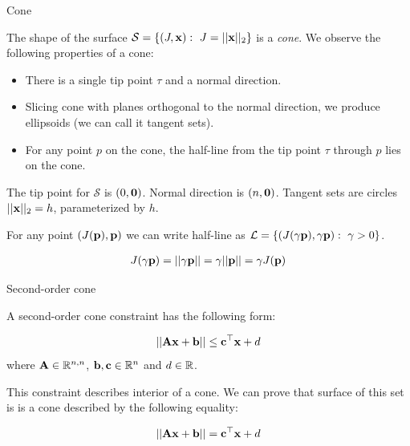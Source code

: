 \documentclass{beamer}
\begin{document}
\begin{frame}{Cone}
	\begin{flushleft}
		
		The shape of the surface $\mathcal S = \{  (J, \mathbf{x}): \ J = || \mathbf{x} ||_2 \}$ is a \emph{cone}. We observe the following properties of a cone:
		
		\begin{itemize}
			\item There is a single tip point $\tau$ and a normal direction.
			
			\item  Slicing cone with planes orthogonal to the normal direction, we produce ellipsoids (we can call it tangent sets).
			
			\item For any point $p$ on the cone, the half-line from the tip point $\tau$ through $p$ lies on the cone.
		\end{itemize}
	
		\bigskip
	
		The tip point for $\mathcal S$ is $(0, \mathbf{0})$. Normal direction is $(n, \mathbf{0})$. Tangent sets are circles $|| \mathbf{x} ||_2 = h$, parameterized by $h$. 
		
		For any point $(J(\mathbf{p}), \mathbf{p})$ we can write half-line as $\mathcal L = \{ ( J(\gamma \mathbf{p}), \gamma \mathbf{p}): \ \gamma > 0 \}$.
		
		\begin{align}
			J(\gamma \mathbf{p}) = ||\gamma \mathbf{p}|| = \gamma ||\mathbf{p}|| = \gamma J(\mathbf{p})
		\end{align}
		
	\end{flushleft}
\end{frame}



\begin{frame}{Second-order cone}
	\begin{flushleft}
		
		A second-order cone constraint has the following form:
		
		\begin{equation}
			||\mathbf{A}\mathbf{x}+\mathbf{b}|| \leq \mathbf{c}^\top \mathbf{x} + d
		\end{equation}
		where $\mathbf{A} \in \mathbb{R}^{n, n}$, $\mathbf{b}, \mathbf{c} \in \mathbb{R}^{n}$ and $d \in \mathbb{R}$.
		
		\bigskip
		
		This constraint describes interior of a cone. We can prove that surface of this set is is a cone described by the following equality:
		
		\begin{equation}
			||\mathbf{A}\mathbf{x}+\mathbf{b}|| = \mathbf{c}^\top \mathbf{x} + d
		\end{equation}
	
	\end{flushleft}
\end{frame}
\end{document}
